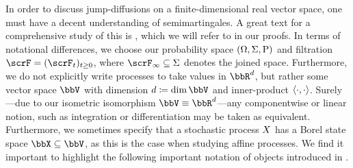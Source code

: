 In order to discuss jump-diffusions on a finite-dimensional real vector space, one must have a decent understanding of semimartingales.
A great text for a comprehensive study of this is \cite{jacod2003}, which we will refer to in our proofs.
In terms of notational differences, we choose our probability space $(\Omega, \Sigma, {\operatorname{P}})$ and filtration $\scrF=(\scrF_t)_{t\geq0}$, where $\scrF_\infty \subseteq \Sigma$ denotes the joined space.
Furthermore, we do not explicitly write processes to take values in $\bbR^d$, but rather some vector space $\vecSpace$ with dimension $d \defeq \operatorname{dim}\vecSpace$ and inner-product ${\langle \cdot , \cdot \rangle}$.
Surely---due to our isometric isomorphism $\vecSpace \equiv \bbR^d$---any componentwise or linear notion, such as integration or differentiation may be taken as equivalent.
Furthermore, we sometimes specify that a stochastic process $X$ has a Borel state space $\stateSpace\subseteq \vecSpace$, as this is the case when studying affine processes.
We find it important to highlight the following important notation of objects introduced in \cite[Chapters I-II]{jacod2003}.
